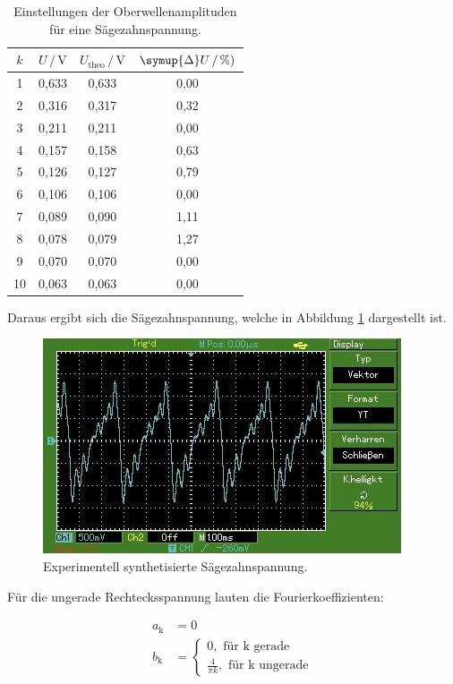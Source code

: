 \begin{table}[H]
    \centering
    \caption{Einstellungen der Oberwellenamplituden für eine Sägezahnspannung.}
    \label{tab:Messdaten4}
    \begin{tabular}{c c c c}
    \toprule
    $k$ & $U \,/\, \si{\volt}$ & $U_\text{theo} \,/\, \si{\volt}$ & $\symup{\Delta}U \,/\, \si{\percent})$ \\
    \midrule
    1 & 0,633 & 0,633 & 0,00 \\
    2 & 0,316 & 0,317 & 0,32 \\
    3 & 0,211 & 0,211 & 0,00 \\
    4 & 0,157 & 0,158 & 0,63 \\
    5 & 0,126 & 0,127 & 0,79 \\
    6 & 0,106 & 0,106 & 0,00 \\
    7 & 0,089 & 0,090 & 1,11 \\
    8 & 0,078 & 0,079 & 1,27 \\
    9 & 0,070 & 0,070 & 0,00 \\
   10 & 0,063 & 0,063 & 0,00 \\
    \bottomrule
    \end{tabular}
\end{table}

Daraus ergibt sich die Sägezahnspannung, welche in Abbildung \ref{fig:Ex1}
dargestellt ist.

\begin{figure}[H]
    \centering
    \includegraphics[scale = 0.7]{content/saege.jpg}
    \caption{Experimentell synthetisierte Sägezahnspannung.}
    \label{fig:Ex1}
\end{figure}

Für die ungerade Rechtecksspannung lauten die Fourierkoeffizienten:

\begin{align*}
    a_\text{k} &= 0 \\
    b_\text{k} &= 
        \begin{cases} 
            0, \text{ für k gerade} \\ \frac{4}{\pi k}, \text{ für k ungerade}
        \end{cases}
\end{align*}

